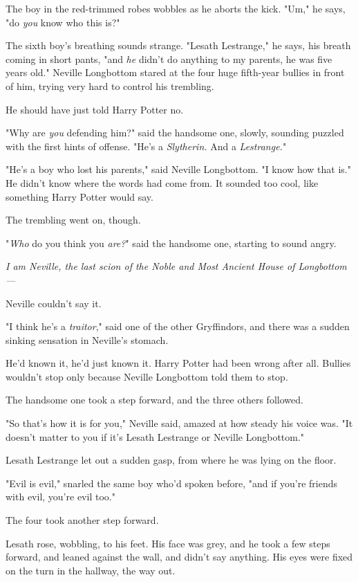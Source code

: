 The boy in the red-trimmed robes wobbles as he aborts the kick. "Um," he says,
"do \emph{you} know who this is?"

The sixth boy's breathing sounds strange. "Lesath Lestrange," he says, his
breath coming in short pants, "and \emph{he} didn't do anything to my parents,
he was five years old."
\sbreak
Neville Longbottom stared at the four huge fifth-year bullies in front of him,
trying very hard to control his trembling.

He should have just told Harry Potter no.

"Why are \emph{you} defending him?" said the handsome one, slowly, sounding
puzzled with the first hints of offense. "He's a \emph{Slytherin.} And a
\emph{Lestrange.}"

"He's a boy who lost his parents," said Neville Longbottom. "I know how that
is." He didn't know where the words had come from. It sounded too cool, like
something Harry Potter would say.

The trembling went on, though.

"\emph{Who} do you think you \emph{are?}" said the handsome one, starting to
sound angry.

\emph{I am Neville, the last scion of the Noble and Most Ancient House of
Longbottom---}

Neville couldn't say it.

"I think he's a \emph{traitor}," said one of the other Gryffindors, and there
was a sudden sinking sensation in Neville's stomach.

He'd known it, he'd just known it. Harry Potter had been wrong after all.
Bullies wouldn't stop only because Neville Longbottom told them to stop.

The handsome one took a step forward, and the three others followed.

"So that's how it is for you," Neville said, amazed at how steady his voice
was. "It doesn't matter to you if it's Lesath Lestrange or Neville Longbottom."

Lesath Lestrange let out a sudden gasp, from where he was lying on the floor.

"Evil is evil," snarled the same boy who'd spoken before, "and if you're
friends with evil, you're evil too."

The four took another step forward.

Lesath rose, wobbling, to his feet. His face was grey, and he took a few steps
forward, and leaned against the wall, and didn't say anything. His eyes were
fixed on the turn in the hallway, the way out.


